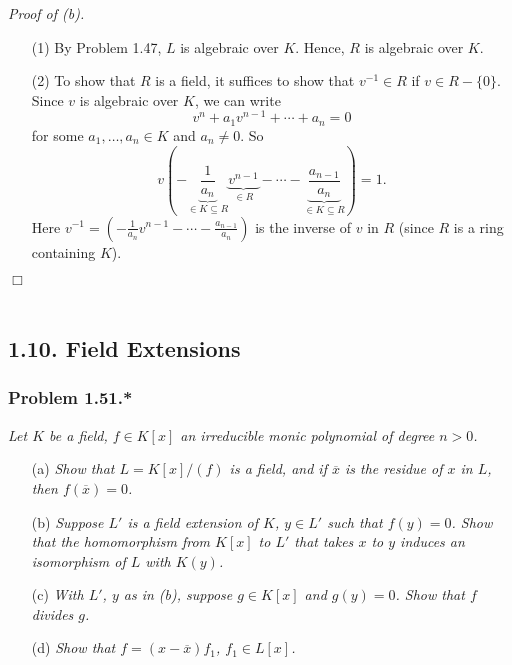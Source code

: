 \documentclass{article}
\begin{document}
\emph{Proof of (b).}
\begin{enumerate}
\item[(1)]
  By Problem 1.47, $L$ is algebraic over $K$.
  Hence, $R$ is algebraic over $K$.

\item[(2)]
  To show that $R$ is a field,
  it suffices to show that $v^{-1} \in R$ if $v \in R - \{0\}$.
  Since $v$ is algebraic over $K$,
  we can write
  \[
    v^n + a_1 v^{n-1} + \cdots + a_n = 0
  \]
  for some $a_1, \ldots, a_n \in K$ and $a_n \neq 0$.
  So
  \[
    v \left(- \underbrace{\frac{1}{a_n}}_{\in K \subseteq R} \underbrace{v^{n-1}}_{\in R}
      - \cdots
      - \underbrace{\frac{a_{n-1}}{a_n}}_{\in K \subseteq R} \right) = 1.
  \]
  Here $v^{-1} = \left(- \frac{1}{a_n} v^{n-1} - \cdots - \frac{a_{n-1}}{a_n} \right)$
  is the inverse of $v$ in $R$ (since $R$ is a ring containing $K$).
\end{enumerate}
$\Box$ \\\\






\subsection*{1.10. Field Extensions \\}



\subsubsection*{Problem 1.51.*}
\emph{Let $K$ be a field, $f \in K[x]$ an irreducible monic polynomial of degree $n > 0$.}
\begin{enumerate}
\item[(a)]
  \emph{Show that $L = K[x]/(f)$ is a field,
  and if $\overline{x}$ is the residue of $x$ in $L$, then $f(\overline{x}) = 0$.}

\item[(b)]
  \emph{Suppose $L'$ is a field extension of $K$, $y \in L'$ such that $f(y) = 0$.
  Show that the homomorphism from $K[x]$ to $L'$
  that takes $x$ to $y$ induces an isomorphism of $L$ with $K(y)$.}

\item[(c)]
  \emph{With $L'$, $y$ as in (b), suppose $g \in K[x]$ and $g(y) = 0$.
  Show that $f$ divides $g$.}

\item[(d)]
  \emph{Show that $f = (x - \overline{x})f_1$, $f_1 \in L[x]$.} \\
\end{enumerate}
\end{document}
